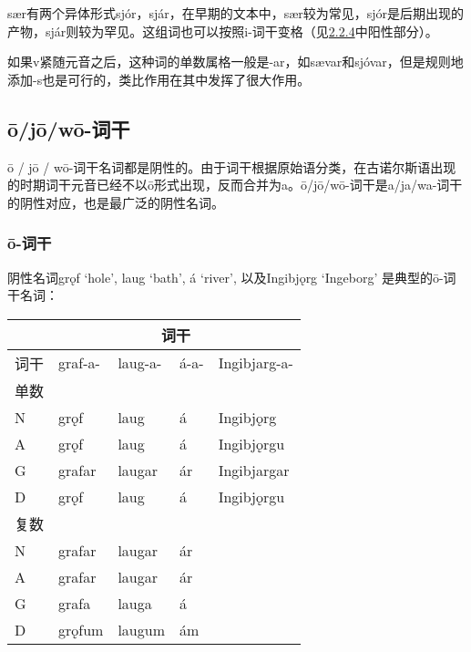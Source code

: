 sær有两个异体形式sjór，sjár，在早期的文本中，sær较为常见，sjór是后期出现的产物，sjár则较为罕见。这组词也可以按照i-词干变格（见\hyperref[_Ref115770706]{2.2.4}中阳性部分）。

如果v紧随元音之后，这种词的单数属格一般是-ar，如sævar和sjóvar，但是规则地添加-s也是可行的，类比作用在其中发挥了很大作用。

\subsection{ō/jō/wō-词干}
\label{ō/jō/wō-词干}

ō / jō /
wō-词干名词都是阴性的。由于词干根据原始语分类，在古诺尔斯语出现的时期词干元音已经不以ō形式出现，反而合并为a。ō/jō/wō-词干是a/ja/wa-词干的阴性对应，也是最广泛的阴性名词。

\subsubsection{ō-词干}

阴性名词grǫf `hole', laug `bath', á `river‌', 以及Ingibjǫrg `Ingeborg‌'
是典型的ō-词干名词：

\begin{longtable}{lllll}
  \toprule
       & \multicolumn{4}{c}{\textbf{词干}}                                 \\
  \midrule
  \endhead
  \bottomrule
  \endfoot
  词干 & graf-a-                           & laug-a- & á-a- & Ingibjarg-a- \\
  单数 &                                   &         &      &              \\
  N    & grǫf                              & laug    & á    & Ingibjǫrg    \\
  A    & grǫf                              & laug    & á    & Ingibjǫrgu   \\
  G    & grafar                            & laugar  & ár   & Ingibjargar  \\
  D    & grǫf                              & laug    & á    & Ingibjǫrgu   \\
  复数 &                                   &         &      &              \\
  N    & grafar                            & laugar  & ár   &              \\
  A    & grafar                            & laugar  & ár   &              \\
  G    & grafa                             & lauga   & á    &              \\
  D    & grǫfum                            & laugum  & ám   &              \\
\end{longtable}

